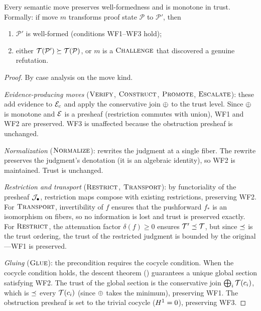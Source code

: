 \begin{theorem}\label{thm:move-soundness}
Every semantic move preserves well-formedness and is monotone
in trust.  Formally: if move $m$ transforms proof state
$\mathcal{P}$ to $\mathcal{P}'$, then
\begin{enumerate}[label=\textnormal{(\alph*)},nosep]
  \item $\mathcal{P}'$ is well-formed (conditions
        \textnormal{WF1--WF3} hold);
  \item either $\mathcal{T}(\mathcal{P}') \succeq \mathcal{T}(\mathcal{P})$,
        or $m$ is a $\textsc{Challenge}$ that discovered a genuine refutation.
\end{enumerate}
\end{theorem}

\begin{proof}
By case analysis on the move kind.

\emph{Evidence-producing moves} ($\textsc{Verify}$, $\textsc{Construct}$,
$\textsc{Promote}$, $\textsc{Escalate}$): these add evidence to $\mathcal{E}_c$ and
apply the conservative join $\oplus$ to the trust level.  Since
$\oplus$ is monotone and $\mathcal{E}$ is a presheaf (restriction
commutes with union), WF1 and WF2 are preserved.  WF3 is
unaffected because the obstruction presheaf is unchanged.

\emph{Normalization} ($\textsc{Normalize}$): rewrites the judgment at
a single fiber.  The rewrite preserves the judgment's denotation
(it is an algebraic identity), so WF2 is maintained.  Trust is
unchanged.

\emph{Restriction and transport} ($\textsc{Restrict}$, $\textsc{Transport}$):
by functoriality of the presheaf $\mathcal{J}_\bullet$, restriction maps
compose with existing restrictions, preserving WF2.  For
$\textsc{Transport}$, invertibility of $f$ ensures that the pushforward
$f_*$ is an isomorphism on fibers, so no information is lost and
trust is preserved exactly.  For $\textsc{Restrict}$, the attenuation
factor $\delta(f) \geq 0$ ensures $\mathcal{T}' \preceq \mathcal{T}$, but
since $\preceq$ is the trust ordering, the trust of the restricted
judgment is bounded by the original---WF1 is preserved.

\emph{Gluing} ($\textsc{Glue}$): the precondition requires the cocycle
condition.  When the cocycle condition holds, the descent theorem
() guarantees a unique global section satisfying
WF2.  The trust of the global section is the conservative join
$\bigoplus_i \mathcal{T}(c_i)$, which is $\preceq$ every $\mathcal{T}(c_i)$
(since $\oplus$ takes the minimum), preserving WF1.  The
obstruction presheaf is set to the trivial cocycle ($H^{1} = 0$),
preserving WF3.


\end{proof}
